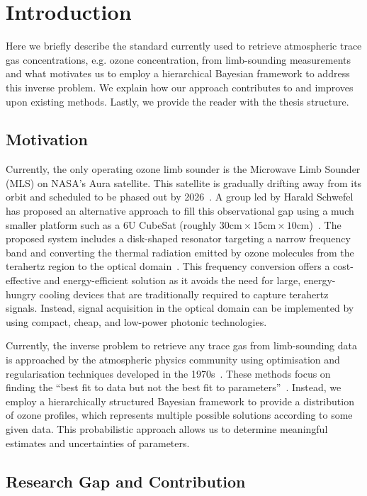 \chapter{Introduction}
\thispagestyle{empty}
Here we briefly describe the standard currently used to retrieve atmospheric trace gas concentrations, e.g. ozone concentration, from limb-sounding measurements and what motivates us to employ a hierarchical Bayesian framework to address this inverse problem.
We explain how our approach contributes to and improves upon existing methods.
Lastly, we provide the reader with the thesis structure.


\section{Motivation}
Currently, the only operating ozone limb sounder is the Microwave Limb Sounder (MLS) on NASA's Aura satellite.
This satellite is gradually drifting away from its orbit and scheduled to be phased out by 2026~\cite{Bryan2024NASA}.
A group led by Harald Schwefel has proposed an alternative approach to fill this observational gap using a much smaller platform such as a 6U CubeSat (roughly $30\text{cm} \times 15\text{cm} \times 10\text{cm}$)~\cite{ustin2024current}. 
The proposed system includes a disk-shaped resonator targeting a narrow frequency band and converting the thermal radiation emitted by ozone molecules from the terahertz region to the optical domain~\cite{Suresh25,Sedlmeir14}. 
This frequency conversion offers a cost-effective and energy-efficient solution as it avoids the need for large, energy-hungry cooling devices that are traditionally required to capture terahertz signals. 
Instead, signal acquisition in the optical domain can be implemented by using compact, cheap, and low-power photonic technologies.

Currently, the inverse problem to retrieve any trace gas from limb-sounding data is approached by the atmospheric physics community using optimisation and regularisation techniques developed in the 1970s~\cite{rodgers1976retrieval, NASA2022MLSv5}.
These methods focus on finding the ``best fit to data but not the best fit to parameters''~\cite{tan2016LecNot}.
Instead, we employ a hierarchically structured Bayesian framework to provide a distribution of ozone profiles, which represents multiple possible solutions according to some given data.
This probabilistic approach allows us to determine meaningful estimates and uncertainties of parameters.

\section{Research Gap and Contribution}

